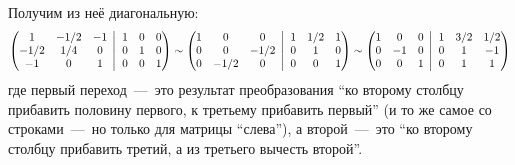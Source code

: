 \documentclass[a4paper,12pt]{article}
\newcommand{\BigMiddleThree}{\;\left|\vphantom{\begin{pmatrix} 0\\0\\0 \end{pmatrix}}\right.\;}
\begin{document}
\begin{solution}
    Получим из неё диагональную:
    \begin{equation}
    \begin{split}
      \left(
        \begin{matrix}
          1    & -1/2 & -1\\
          -1/2 & 1/4  & 0\\
          -1   & 0    & 1
        \end{matrix}
        \BigMiddleThree
        \begin{matrix}
          1 & 0 & 0\\
          0 & 1 & 0\\
          0 & 0 & 1
        \end{matrix}
      \right)
      \sim \left(
        \begin{matrix}
          1 & 0    & 0\\
          0 & 0    & -1/2\\
          0 & -1/2 & 0
        \end{matrix}
        \BigMiddleThree
        \begin{matrix}
          1 & 1/2 & 1\\
          0 & 1   & 0\\
          0 & 0   & 1
        \end{matrix}
      \right)
      \sim \left(
        \begin{matrix}
          1 & 0  & 0\\
          0 & -1 & 0\\
          0 & 0  & 1
        \end{matrix}
        \BigMiddleThree
        \begin{matrix}
          1 & 3/2 & 1/2\\
          0 & 1   & -1\\
          0 & 1   & 1
        \end{matrix}
      \right)
    \end{split}
    \end{equation}
    где первый переход~---~это результат преобразования ``ко второму столбцу прибавить половину первого, к третьему прибавить первый'' (и то же самое со строками~---~но только для матрицы ``слева''), а второй~---~это ``ко второму столбцу прибавить третий, а из третьего вычесть второй''.
    

\end{solution}
\end{document}

